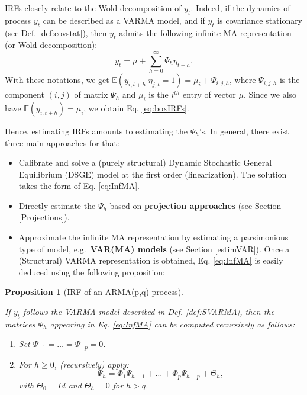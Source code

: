 \documentclass[
  12pt,
]{book}
\providecommand{\tightlist}{%
  \setlength{\itemsep}{0pt}\setlength{\parskip}{0pt}}
\newtheorem{proposition}{Proposition}[chapter]
\theoremstyle{definition}
\theoremstyle{definition}
\theoremstyle{definition}
\theoremstyle{definition}
\theoremstyle{remark}
\begin{document}
IRFs closely relate to the Wold decomposition of \(y_t\). Indeed, if the dynamics of process \(y_t\) can be described as a VARMA model, and if \(y_t\) is covariance stationary (see Def. \ref{def:covstat}), then \(y_t\) admits the following infinite MA representation (or Wold decomposition):
\begin{equation}
y_t = \mu + \sum_{h=0}^\infty \Psi_{h} \eta_{t-h}.\label{eq:InfMA}
\end{equation}
With these notations, we get \(\mathbb{E}(y_{i,t+h}|\eta_{j,t}=1) = \mu_i + \Psi_{i,j,h}\), where \(\Psi_{i,j,h}\) is the component \((i,j)\) of matrix \(\Psi_h\) and \(\mu_i\) is the \(i^{th}\) entry of vector \(\mu\). Since we also have \(\mathbb{E}(y_{i,t+h})=\mu_i\), we obtain Eq. \eqref{eq:boxIRFs}.

Hence, estimating IRFs amounts to estimating the \(\Psi_{h}\)'s. In general, there exist three main approaches for that:

\begin{itemize}
\tightlist
\item
  Calibrate and solve a (purely structural) Dynamic Stochastic General Equilibrium (DSGE) model at the first order (linearization). The solution takes the form of Eq. \eqref{eq:InfMA}.
\item
  Directly estimate the \(\Psi_{h}\) based on \textbf{projection approaches} (see Section \ref{Projections}).
\item
  Approximate the infinite MA representation by estimating a parsimonious type of model, e.g.~\textbf{VAR(MA) models} (see Section \ref{estimVAR}). Once a (Structural) VARMA representation is obtained, Eq. \eqref{eq:InfMA} is easily deduced using the following proposition:
\end{itemize}

\begin{proposition}[IRF of an ARMA(p,q) process]
\protect\hypertarget{prp:computPsi}{}\label{prp:computPsi}

If \(y_t\) follows the VARMA model described in Def. \ref{def:SVARMA}, then the matrices \(\Psi_h\) appearing in Eq. \eqref{eq:InfMA} can be computed recursively as follows:

\begin{enumerate}
\def\labelenumi{\arabic{enumi}.}
\tightlist
\item
  Set \(\Psi_{-1}=\dots=\Psi_{-p}=0\).
\item
  For \(h \ge 0\), (recursively) apply:
  \[
  \Psi_h = \Phi_1 \Psi_{h-1} + \dots + \Phi_p \Psi_{h-p} + \Theta_h,
  \]
  with \(\Theta_0 = Id\) and \(\Theta_h = 0\) for \(h>q\).
\end{enumerate}

\end{proposition}
\end{document}
